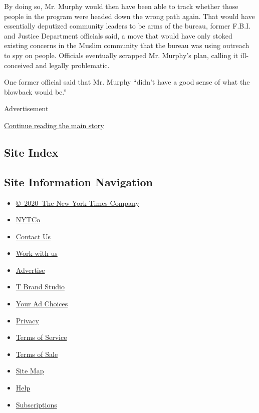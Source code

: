 By doing so, Mr. Murphy would then have been able to track whether those
people in the program were headed down the wrong path again. That would
have essentially deputized community leaders to be arms of the bureau,
former F.B.I. and Justice Department officials said, a move that would
have only stoked existing concerns in the Muslim community that the
bureau was using outreach to spy on people. Officials eventually
scrapped Mr. Murphy's plan, calling it ill-conceived and legally
problematic.

One former official said that Mr. Murphy ``didn't have a good sense of
what the blowback would be.''

Advertisement

\protect\hyperlink{after-bottom}{Continue reading the main story}

\hypertarget{site-index}{%
\subsection{Site Index}\label{site-index}}

\hypertarget{site-information-navigation}{%
\subsection{Site Information
Navigation}\label{site-information-navigation}}

\begin{itemize}
\tightlist
\item
  \href{https://help.nytimes3xbfgragh.onion/hc/en-us/articles/115014792127-Copyright-notice}{©~2020~The
  New York Times Company}
\end{itemize}

\begin{itemize}
\tightlist
\item
  \href{https://www.nytco.com/}{NYTCo}
\item
  \href{https://help.nytimes3xbfgragh.onion/hc/en-us/articles/115015385887-Contact-Us}{Contact
  Us}
\item
  \href{https://www.nytco.com/careers/}{Work with us}
\item
  \href{https://nytmediakit.com/}{Advertise}
\item
  \href{http://www.tbrandstudio.com/}{T Brand Studio}
\item
  \href{https://www.nytimes3xbfgragh.onion/privacy/cookie-policy\#how-do-i-manage-trackers}{Your
  Ad Choices}
\item
  \href{https://www.nytimes3xbfgragh.onion/privacy}{Privacy}
\item
  \href{https://help.nytimes3xbfgragh.onion/hc/en-us/articles/115014893428-Terms-of-service}{Terms
  of Service}
\item
  \href{https://help.nytimes3xbfgragh.onion/hc/en-us/articles/115014893968-Terms-of-sale}{Terms
  of Sale}
\item
  \href{https://spiderbites.nytimes3xbfgragh.onion}{Site Map}
\item
  \href{https://help.nytimes3xbfgragh.onion/hc/en-us}{Help}
\item
  \href{https://www.nytimes3xbfgragh.onion/subscription?campaignId=37WXW}{Subscriptions}
\end{itemize}
